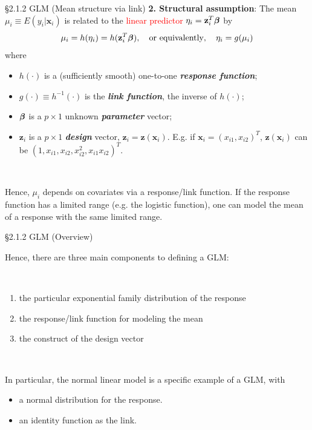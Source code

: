 \documentclass{beamer}
\begin{document}
\begin{frame}{\S2.1.2 GLM (Mean structure via link)}
\noindent
\textbf{2. Structural assumption}: The mean $\mu_i \equiv E(y_i|\textbf{x}_i)$ is related to the \textcolor{red}{linear predictor} $\eta_i=\textbf{z}_i^T\mbox{\boldmath $\beta$}$ by
$$\mu_i=h(\eta_i)=h(\textbf{z}_i^T\mbox{\boldmath $\beta$}), \quad\mbox{or equivalently},\quad
\eta_i=g(\mu_i)$$
where
\begin{itemize}
\item
$h(\cdot)$ is a (sufficiently smooth) one-to-one \textit{\bf response function};
\item
$g(\cdot) \equiv h^{-1}(\cdot)$ is the \textit{\bf link function}, the inverse of $h(\cdot)$;
\item
$\mbox{\boldmath $\beta$}$ is a $p\times 1$ unknown \textit{\bf parameter} vector;
\item
$\textbf{z}_i$ is a $p\times 1$  \textit{\bf design} vector, $\textbf{z}_i=\textbf{z}(\textbf{x}_i)$. E.g. if $\textbf{x}_i = (x_{i1}, x_{i2})^T$, 
$\textbf{z}(\textbf{x}_i)$ can be $(1 , x_{i1} ,   x_{i2} ,   x_{i2}^2 , x_{i1} x_{i2})^T  $.
\end{itemize}


\ \

Hence, $\mu_i$ depends on covariates  via a response/link function. If the response function has a limited range (e.g. the logistic  function), one can model the mean of a response with the same limited range.

\end{frame}

\begin{frame} {\S2.1.2 GLM (Overview)}

Hence, there are three main components to defining a GLM: 

\ \

\begin{enumerate}
\item the particular exponential family distribution of the response
\item the response/link function for modeling the mean
\item the construct of the design vector
\end{enumerate}

\ \

In particular, the normal linear model is a specific example of a GLM, with
\begin{itemize}
\item a normal distribution for the response.
\item  an identity function as the link. 
\end{itemize}

\end{frame}
\end{document}

